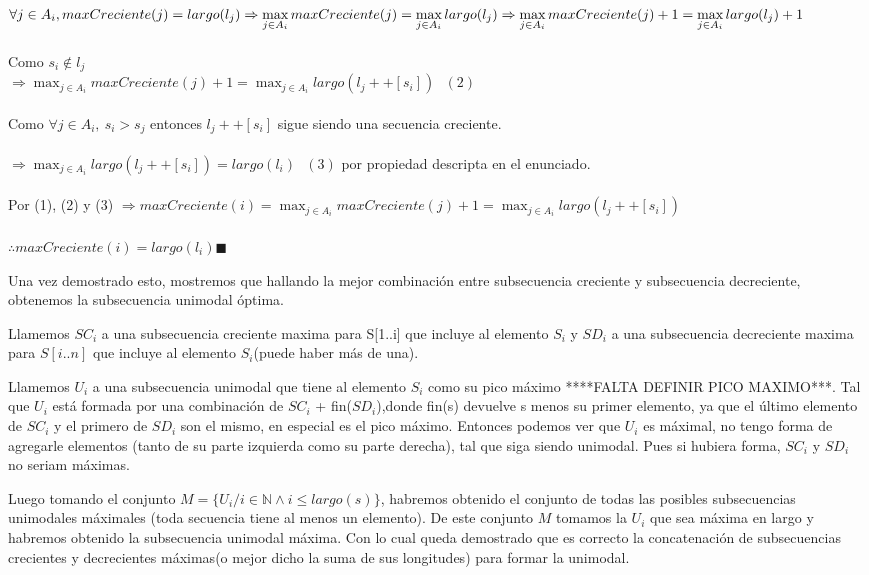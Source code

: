 $\displaystyle \forall j \in A_i , maxCreciente(j) = largo(l_j) \\
\\
 \Rightarrow \max_{j \in A_i} {maxCreciente(j)} = \max_{j \in A_i} {largo(l_j)} \\
 \\
 \Rightarrow \max_{j \in A_i} {maxCreciente(j) + 1} = \max_{j \in A_i} {largo(l_j) + 1}$ \\
 \\
Como $s_i  \notin l_j$
\\
$\displaystyle \Rightarrow \max_{j \in A_i} {maxCreciente(j) + 1} = \max_{j \in A_i} {largo(l_j ++ [s_i])} \ \ \ (2)$ \\
\\
Como $\forall j \in A_i,\ s_i > s_j$ entonces $l_j ++ [s_i]$  sigue siendo una secuencia creciente.\\
\\
$\displaystyle \Rightarrow \max_{j \in A_i} {largo(l_j ++ [s_i])} = largo(l_i)\ \ \ (3) $ por propiedad descripta en el enunciado. \\ 
\\
Por (1), (2) y (3)      
$\displaystyle \Rightarrow maxCreciente(i) = \max_{j \in A_i} {maxCreciente(j) + 1} = \max_{j \in A_i} {largo(l_j ++ [s_i])}$ \\
\\
$\displaystyle \therefore maxCreciente(i) = largo(l_i) \blacksquare$ 

Una vez demostrado esto, mostremos que hallando la mejor combinación entre subsecuencia creciente y subsecuencia decreciente, obtenemos la subsecuencia unimodal óptima. 

Llamemos $SC_i$ a una subsecuencia creciente maxima para S[1..i] que incluye al elemento $S_i$ y $SD_i$ a una subsecuencia decreciente maxima para $S[i..n]$ que incluye al elemento $S_i$(puede haber más de una).

Llamemos $U_i$ a una subsecuencia unimodal que tiene al elemento $S_i$ como su pico máximo ****FALTA DEFINIR PICO MAXIMO***.
Tal que $U_i$ está formada por una combinación de $SC_i$ + fin($SD_i$),donde fin(s) devuelve s menos su primer elemento, ya que el último elemento de $SC_i$ y el primero de $SD_i$ son el mismo, en especial es el pico máximo. Entonces podemos ver que $U_i$ es máximal, no tengo forma de agregarle elementos (tanto de su parte izquierda como su parte derecha), tal que siga siendo unimodal. Pues si hubiera forma, $SC_i$ y $SD_i$ no seriam máximas.

Luego tomando el conjunto $M = \{U_i / i \in \mathbb{N} \land i \le largo(s)\}$, habremos obtenido el conjunto de todas las posibles subsecuencias unimodales máximales (toda secuencia tiene al menos un elemento). De este conjunto $M$ tomamos la $U_i$ que sea máxima en largo y habremos obtenido la subsecuencia unimodal máxima. Con lo cual queda demostrado que es correcto la concatenación de subsecuencias crecientes y decrecientes máximas(o mejor dicho la suma de sus longitudes) para formar la unimodal.

